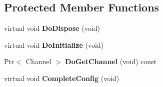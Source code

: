 \subsection*{\-Protected \-Member \-Functions}
\begin{DoxyCompactItemize}
\item 
\hypertarget{classns3_1_1PLC__NetDevice_a611509764bf53c3c8806b9b1a7bc5aa2}{virtual void {\bfseries \-Do\-Dispose} (void)}\label{classns3_1_1PLC__NetDevice_a611509764bf53c3c8806b9b1a7bc5aa2}

\item 
\hypertarget{classns3_1_1PLC__NetDevice_a5960c3c3752998d282c9d124ac19ace1}{virtual void {\bfseries \-Do\-Initialize} (void)}\label{classns3_1_1PLC__NetDevice_a5960c3c3752998d282c9d124ac19ace1}

\item 
\hypertarget{classns3_1_1PLC__NetDevice_a61bfbf6553a988bcf1e6eb65aed6d7ca}{\-Ptr$<$ \-Channel $>$ {\bfseries \-Do\-Get\-Channel} (void) const }\label{classns3_1_1PLC__NetDevice_a61bfbf6553a988bcf1e6eb65aed6d7ca}

\item 
\hypertarget{classns3_1_1PLC__NetDevice_a84e2c58327438a3a87650c908fb43188}{virtual void {\bfseries \-Complete\-Config} (void)}\label{classns3_1_1PLC__NetDevice_a84e2c58327438a3a87650c908fb43188}

\end{DoxyCompactItemize}
